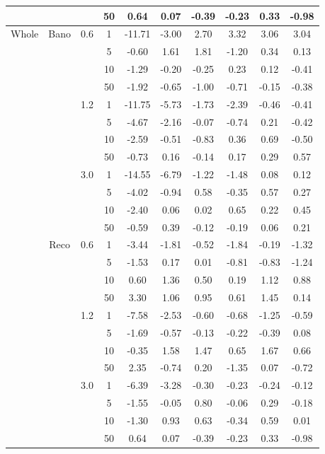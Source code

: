 \documentclass[conference]{IEEEtran}
\begin{document}
\begin{table}[htbp]
\begin{minipage}{\linewidth}
\begin{center}
{\begin{tabular}{|c|c|c|c|c|c|c|c|c|c|}
\cline{4-10}&&&50&0.64&0.07&-0.39&-0.23&0.33&-0.98 \\
\hline
Whole&Bano&0.6&1&-11.71&-3.00&2.70&3.32&3.06&3.04\\
\cline{4-10}&&&5&-0.60&1.61&1.81&-1.20&0.34&0.13\\
\cline{4-10}&&&10&-1.29&-0.20&-0.25&0.23&0.12&-0.41 \\
\cline{4-10}&&&50&-1.92&-0.65&-1.00&-0.71&-0.15&-0.38 \\
\cline{3-10}&&1.2&1&-11.75&-5.73&-1.73&-2.39&-0.46&-0.41 \\
\cline{4-10}&&&5&-4.67&-2.16&-0.07&-0.74&0.21&-0.42 \\
\cline{4-10}&&&10&-2.59&-0.51&-0.83&0.36&0.69&-0.50 \\
\cline{4-10}&&&50&-0.73&0.16&-0.14&0.17&0.29&0.57 \\
\cline{3-10}&&3.0&1&-14.55&-6.79&-1.22&-1.48&0.08&0.12 \\
\cline{4-10}&&&5&-4.02&-0.94&0.58&-0.35&0.57&0.27 \\
\cline{4-10}&&&10&-2.40&0.06&0.02&0.65&0.22&0.45 \\
\cline{4-10}&&&50&-0.59&0.39&-0.12&-0.19&0.06&0.21 \\
\cline{2-10}&Reco&0.6&1&-3.44&-1.81&-0.52&-1.84&-0.19&-1.32 \\
\cline{4-10}&&&5&-1.53&0.17&0.01&-0.81&-0.83&-1.24 \\
\cline{4-10}&&&10&0.60&1.36&0.50&0.19&1.12&0.88 \\
\cline{4-10}&&&50&3.30&1.06&0.95&0.61&1.45&0.14 \\
\cline{3-10}&&1.2&1&-7.58&-2.53&-0.60&-0.68&-1.25&-0.59 \\
\cline{4-10}&&&5&-1.69&-0.57&-0.13&-0.22&-0.39&0.08 \\
\cline{4-10}&&&10&-0.35&1.58&1.47&0.65&1.67&0.66 \\
\cline{4-10}&&&50&2.35&-0.74&0.20&-1.35&0.07&-0.72 \\
\cline{3-10}&&3.0&1&-6.39&-3.28&-0.30&-0.23&-0.24&-0.12 \\
\cline{4-10}&&&5&-1.55&-0.05&0.80&-0.06&0.29&-0.18 \\
\cline{4-10}&&&10&-1.30&0.93&0.63&-0.34&0.59&0.01 \\
\cline{4-10}&&&50&0.64&0.07&-0.39&-0.23&0.33&-0.98 \\
\hline
\end{tabular}
}
\label{tab2}
\end{center}
\end{minipage}
\end{table}
\end{document}
